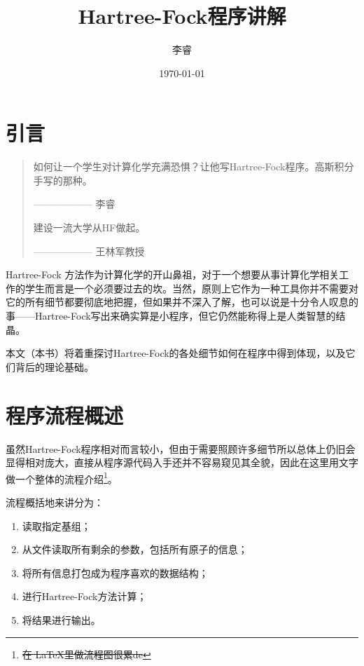 \documentclass[12pt,a4paper,openany,twoside]{article}
\title{Hartree-Fock程序讲解}
\author{李睿}
\date{\today}
\numberwithin{equation}{section}
\begin{document}
        \maketitle
        \tableofcontents


        \section{引言}
            \begin{quote}
                如何让一个学生对计算化学充满恐惧？让他写Hartree-Fock程序。高斯积分手写的那种。
                \begin{flushright}
                    —————— 李睿
                \end{flushright}

                建设一流大学从HF做起。
                
                \begin{flushright}
                    —————— 王林军教授
                \end{flushright}
            \end{quote}

            Hartree-Fock 方法作为计算化学的开山鼻祖，对于一个想要从事计算化学相关工作的学生而言是一个必须要过去的坎。当然，原则上它作为一种工具你并不需要对它的所有细节都要彻底地把握，但如果并不深入了解，也可以说是十分令人叹息的事——Hartree-Fock写出来确实算是小程序，但它仍然能称得上是人类智慧的结晶。

            本文（本书）将着重探讨Hartree-Fock的各处细节如何在程序中得到体现，以及它们背后的理论基础。

        \section{程序流程概述}

            虽然Hartree-Fock程序相对而言较小，但由于需要照顾许多细节所以总体上仍旧会显得相对庞大，直接从程序源代码入手还并不容易窥见其全貌，因此在这里用文字做一个整体的流程介绍\footnote{\sout{在 \LaTeX 里做流程图很累de}}。

            流程概括地来讲分为：
            \begin{enumerate}
                \item 读取指定基组；
                \item 从文件读取所有剩余的参数，包括所有原子的信息；
                \item 将所有信息打包成为程序喜欢的数据结构；
                \item 进行Hartree-Fock方法计算；
                \item 将结果进行输出。
            \end{enumerate}
\end{document}
